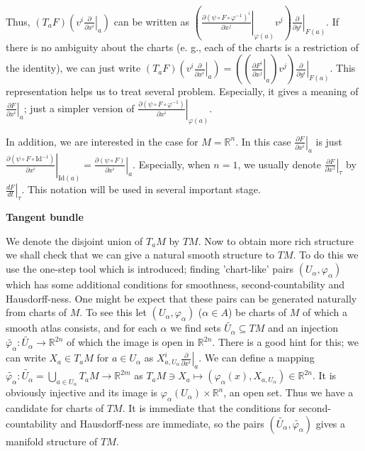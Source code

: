 \documentclass{article}
\newcommand{\ReR}{\mathbb{R}}
\newcommand{\parderbar}[3]{\left. \frac{\partial #1}{\partial #2} \right|_{#3}}
\newcommand{\ordderbar}[3]{\left. \frac{d #1}{d #2} \right|_{#3}}
\begin{document}
Thus, $(T_a F) \left( v^i \parderbar{}{x^i}{a} \right)$ can be written as $\left( \parderbar{(\psi \circ F \circ \varphi^{-1})^i}{x^j}{\varphi(a)} v^j \right) \parderbar{}{y^i}{F(a)}$.
If there is no ambiguity about the charts (e. g., each of the charts is a restriction of the identity), we can just write $(T_a F) \left( v^i \parderbar{}{x^i}{a} \right) = \left( \left( \parderbar{F^i}{x^j}{a} \right) v^j \right) \parderbar{}{y^i}{F(a)}$.
This representation helps us to treat several problem.
Especially, it gives a meaning of $\parderbar{F}{x^i}{a}$; just a simpler version of $\parderbar{(\psi \circ F \circ \varphi^{-1})}{x^i}{\varphi(a)}$.

In addition, we are interested in the case for $M = \ReR^n$.
In this case $\parderbar{F}{x^i}{a}$ is just $\parderbar{(\psi \circ F \circ \textrm{Id}^{-1})}{x^i}{\textrm{Id}(a)} = \parderbar{(\psi \circ F)}{x^i}{a}$.
Especially, when $n = 1$, we usually denote $\parderbar{F}{x^1}{\tau}$ by $\ordderbar{F}{t}{\tau}$.
This notation will be used in several important stage.

\newpage

\textbf{Tangent bundle}

We denote the disjoint union of $T_a M$ by $TM$.
Now to obtain more rich structure we shall check that we can give a natural smooth structure to $TM$.
To do this we use the one-step tool which is introduced; finding 'chart-like' pairs $(U_\alpha, \varphi_\alpha)$ which has some additional conditions for smoothness, second-countability and Hausdorff-ness.
One might be expect that these pairs can be generated naturally from charts of $M$.
To see this let $(U_\alpha, \varphi_\alpha)$ ($\alpha \in A$) be charts of $M$ of which a smooth atlas consists, and for each $\alpha$ we find sets $\tilde{U_\alpha} \subseteq TM$ and an injection $\tilde{\varphi_\alpha} : \tilde{U_\alpha} \to \ReR^{2n}$ of which the image is open in $\ReR^{2n}$.
There is a good hint for this; we can write $X_a \in T_a M$ for $a \in U_\alpha$ as $X_{a, U_\alpha}^i \parderbar{}{x^i}{a}$.
We can define a mapping $\tilde{\varphi_\alpha} : \tilde{U_\alpha} = \bigcup_{a \in U_\alpha} T_a M \to \ReR^{2m}$ as $T_a M \ni X_a \mapsto (\varphi_\alpha(x), X_{a, U_\alpha}) \in \ReR^{2n}$.
It is obviously injective and its image is $\varphi_\alpha(U_\alpha) \times \ReR^n$, an open set.
Thus we have a candidate for charts of $TM$.
It is immediate that the conditions for second-countability and Hausdorff-ness are immediate, so the pairs $(\tilde{U_\alpha}, \tilde{\varphi_\alpha})$ gives a manifold structure of $TM$.
\end{document}
